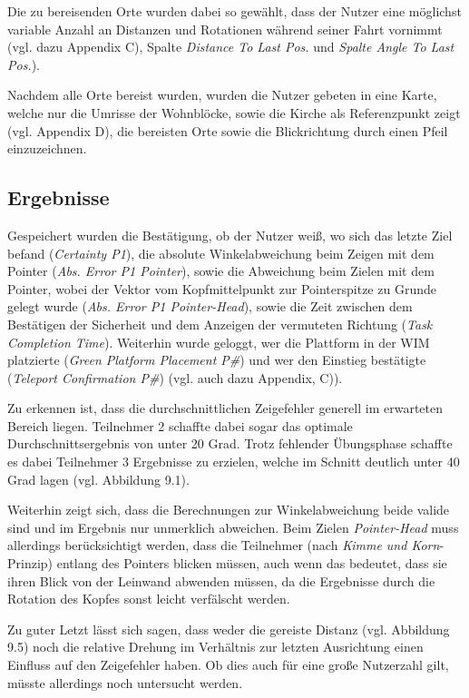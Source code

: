 Die zu bereisenden Orte wurden dabei so gewählt, dass der Nutzer eine möglichst variable Anzahl an Distanzen und Rotationen während seiner Fahrt vornimmt (vgl. dazu Appendix C), Spalte \textit{Distance To Last Pos.} und \textit{Spalte Angle To Last Pos.}).

Nachdem alle Orte bereist wurden, wurden die Nutzer gebeten in eine Karte, welche nur die Umrisse der Wohnblöcke, sowie die Kirche als Referenzpunkt zeigt (vgl. Appendix D), die bereisten Orte sowie die Blickrichtung durch einen Pfeil einzuzeichnen.


\subsection{Ergebnisse}

Gespeichert wurden die Bestätigung, ob der Nutzer weiß, wo sich das letzte Ziel befand (\textit{Certainty P1}), die absolute Winkelabweichung beim Zeigen mit dem Pointer (\textit{Abs. Error P1 Pointer}), sowie die Abweichung beim Zielen mit dem Pointer, wobei der Vektor vom Kopfmittelpunkt zur Pointerspitze zu Grunde gelegt wurde (\textit{Abs. Error P1 Pointer-Head}), sowie die Zeit zwischen dem Bestätigen der Sicherheit und dem Anzeigen der vermuteten Richtung (\textit{Task Completion Time}). Weiterhin wurde geloggt, wer die Plattform in der WIM platzierte (\textit{Green Platform Placement P\#}) und wer den Einstieg bestätigte (\textit{Teleport Confirmation P\#}) (vgl. auch dazu Appendix, C)).

Zu erkennen ist, dass die durchschnittlichen Zeigefehler generell im erwarteten Bereich liegen. Teilnehmer 2 schaffte dabei sogar das optimale Durchschnittsergebnis von unter 20 Grad. Trotz fehlender Übungsphase schaffte es dabei Teilnehmer 3 Ergebnisse zu erzielen, welche im Schnitt deutlich unter 40 Grad lagen (vgl. Abbildung 9.1).

Weiterhin zeigt sich, dass die Berechnungen zur Winkelabweichung beide valide sind und im Ergebnis nur unmerklich abweichen. Beim Zielen \textit{Pointer-Head} muss allerdings berücksichtigt werden, dass die Teilnehmer (nach \textit{Kimme und Korn}-Prinzip) entlang des Pointers blicken müssen, auch wenn das bedeutet, dass sie ihren Blick von der Leinwand abwenden müssen, da die Ergebnisse durch die Rotation des Kopfes sonst leicht verfälscht werden.

Zu guter Letzt lässt sich sagen, dass weder die gereiste Distanz (vgl. Abbildung 9.5) noch die relative Drehung im Verhältnis zur letzten Ausrichtung einen Einfluss auf den Zeigefehler haben. Ob dies auch für eine große Nutzerzahl gilt, müsste allerdings noch untersucht werden.


